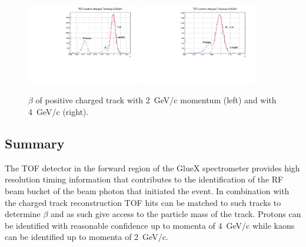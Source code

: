 \begin{figure}[tbp]
\begin{center}
\includegraphics[width=0.45\textwidth]{figures/TOF_postracks_2000mev.pdf}
\includegraphics[width=0.45\textwidth]{figures/TOF_postracks_4000mev.pdf}
\caption{\label{fig:betaproj}$\beta$ of positive charged track with 2~GeV/c momentum (left) and with 4~GeV/c (right).}
\end{center}
\end{figure}

\subsection{Summary \label{sec:scsummary}}
The TOF detector in the forward region of the GlueX spectrometer provides high resolution timing information that contributes
to the identification of the RF beam bucket of the beam photon that initiated the event. In combination with the charged
track reconstruction TOF hits can be matched to such tracks to determine $\beta$ and as such give access to the particle
mass of the track. Protons can be identified with reasonable confidence up to momenta of 4~GeV/c while kaons can be
identified up to momenta of 2~GeV/c.
